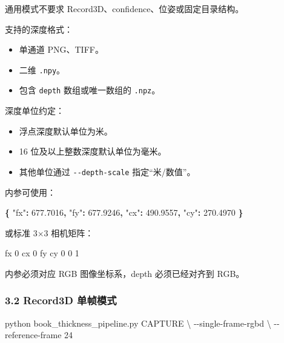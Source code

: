 \documentclass[
  chinese,
  11pt,
  a4paper,
]{article}
\newenvironment{Shaded}{\begin{snugshade}}{\end{snugshade}}
\newcommand{\AttributeTok}[1]{\textcolor[rgb]{0.13,0.29,0.53}{#1}}
\newcommand{\DataTypeTok}[1]{\textcolor[rgb]{0.13,0.29,0.53}{#1}}
\newcommand{\ExtensionTok}[1]{#1}
\newcommand{\FloatTok}[1]{\textcolor[rgb]{0.00,0.00,0.81}{#1}}
\newcommand{\FunctionTok}[1]{\textcolor[rgb]{0.13,0.29,0.53}{\textbf{#1}}}
\newcommand{\NormalTok}[1]{#1}
\providecommand{\tightlist}{%
  \setlength{\itemsep}{0pt}\setlength{\parskip}{0pt}}
\begin{document}
通用模式不要求 Record3D、confidence、位姿或固定目录结构。

支持的深度格式：

\begin{itemize}
\tightlist
\item
  单通道 PNG、TIFF。
\item
  二维 \texttt{.npy}。
\item
  包含 \texttt{depth} 数组或唯一数组的 \texttt{.npz}。
\end{itemize}

深度单位约定：

\begin{itemize}
\tightlist
\item
  浮点深度默认单位为米。
\item
  16 位及以上整数深度默认单位为毫米。
\item
  其他单位通过 \texttt{-\/-depth-scale} 指定``米/数值''。
\end{itemize}

内参可使用：

\begin{Shaded}
\begin{Highlighting}[]
\FunctionTok{\{}
  \DataTypeTok{"fx"}\FunctionTok{:} \FloatTok{677.7016}\FunctionTok{,}
  \DataTypeTok{"fy"}\FunctionTok{:} \FloatTok{677.9246}\FunctionTok{,}
  \DataTypeTok{"cx"}\FunctionTok{:} \FloatTok{490.9557}\FunctionTok{,}
  \DataTypeTok{"cy"}\FunctionTok{:} \FloatTok{270.4970}
\FunctionTok{\}}
\end{Highlighting}
\end{Shaded}

或标准 3×3 相机矩阵：

\begin{Shaded}
\begin{Highlighting}[]
\NormalTok{fx  0  cx}
\NormalTok{0  fy  cy}
\NormalTok{0   0   1}
\end{Highlighting}
\end{Shaded}

内参必须对应 RGB 图像坐标系，depth 必须已经对齐到 RGB。

\subsubsection{3.2 Record3D
单帧模式}\label{32-record3d-ux5355ux5e27ux6a21ux5f0f}

\begin{Shaded}
\begin{Highlighting}[]
\ExtensionTok{python}\NormalTok{ book\_thickness\_pipeline.py CAPTURE }\DataTypeTok{\textbackslash{}}
  \AttributeTok{{-}{-}single{-}frame{-}rgbd} \DataTypeTok{\textbackslash{}}
  \AttributeTok{{-}{-}reference{-}frame}\NormalTok{ 24}
\end{Highlighting}
\end{Shaded}
\end{document}
